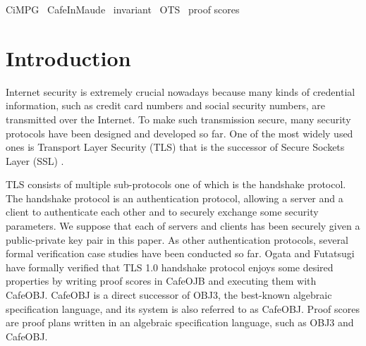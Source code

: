 \documentclass[a4paper,fleqn]{cas-dc}
\begin{document}


\begin{keywords}
 CiMPG \ CafeInMaude \ invariant \ OTS \ proof scores
\end{keywords}

\section{Introduction}\label{intro}
Internet security is extremely crucial nowadays because many kinds of credential information, such as credit card numbers and social security numbers, are transmitted over the Internet. To make such transmission secure, many security protocols have been designed and developed so far. One of the most widely used ones is Transport Layer Security (TLS) \cite{dierk} that is the successor of Secure Sockets Layer (SSL) \cite{*1}. 

TLS consists of multiple sub-protocols one of which is the handshake protocol. The handshake protocol is an authentication protocol, allowing a server and a client to authenticate each other and to securely exchange some security parameters. We suppose that each of servers and clients has been securely given a public-private key pair in this paper. As other authentication protocols, several formal verification case studies \cite{article, 10.1145/3133956.3134063, 10.1145/967900.968063} have been conducted so far. Ogata and Futatsugi \cite{1437139} have formally verified that TLS 1.0 handshake protocol enjoys some desired properties by writing proof scores \cite{OgataF03fmoods} in CafeOJB \cite{DiaconescuF98amast} and executing them with CafeOBJ. 
CafeOBJ is a direct successor of OBJ3, the best-known algebraic specification language, and its system is also referred to as CafeOBJ. Proof scores are proof plans written in an algebraic specification language, such as OBJ3 and CafeOBJ.
\end{document}

